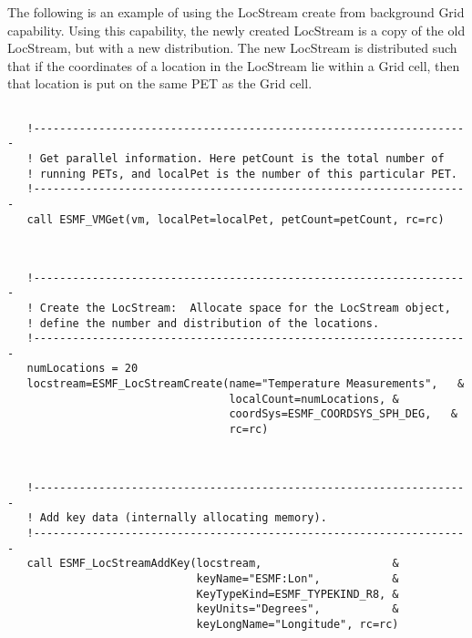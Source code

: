    The following is an example of using the LocStream create from background
   Grid capability. Using this capability, the newly created LocStream 
   is a copy of the old LocStream, but with a new distribution. The new LocStream 
   is distributed such that if the coordinates of a location in the LocStream lie 
   within a Grid cell, then that location is put on the same PET as the Grid cell. 
   

 \begin{verbatim}

   !-------------------------------------------------------------------
   ! Get parallel information. Here petCount is the total number of 
   ! running PETs, and localPet is the number of this particular PET.
   !-------------------------------------------------------------------
   call ESMF_VMGet(vm, localPet=localPet, petCount=petCount, rc=rc)

 
\end{verbatim}
 

 \begin{verbatim}
   !-------------------------------------------------------------------
   ! Create the LocStream:  Allocate space for the LocStream object, 
   ! define the number and distribution of the locations. 
   !-------------------------------------------------------------------
   numLocations = 20
   locstream=ESMF_LocStreamCreate(name="Temperature Measurements",   &
                                  localCount=numLocations, &
                                  coordSys=ESMF_COORDSYS_SPH_DEG,   &
                                  rc=rc)
 
\end{verbatim}
 

 \begin{verbatim}

   !-------------------------------------------------------------------
   ! Add key data (internally allocating memory).
   !-------------------------------------------------------------------
   call ESMF_LocStreamAddKey(locstream,                    &
                             keyName="ESMF:Lon",           &
                             KeyTypeKind=ESMF_TYPEKIND_R8, &
                             keyUnits="Degrees",           &
                             keyLongName="Longitude", rc=rc)

 
\end{verbatim}
 
